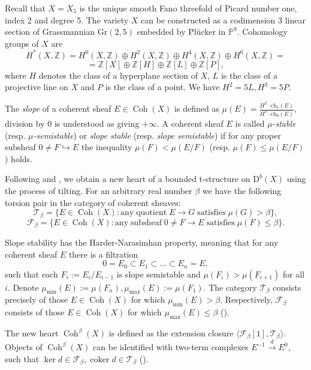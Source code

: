 \documentclass{amsart}
\newcommand{\Coh}{\operatorname{Coh}}
\DeclareMathOperator{\coker}{coker}
\def\Z{\ensuremath{\mathbb{Z}}}
\begin{document}
	Recall that $X=X_5$ is the unique smooth Fano threefold of Picard number one, index 2 and degree 5. The variety $X$ can be constructed as a codimension 3 linear section of Grassmannian $\mathrm{Gr}(2,5)$ embedded by Pl\"ucker in $\mathbb P^9$. Cohomology groups of $X$ are 
	$$H^*(X,\mathbb Z)=H^0(X,\mathbb Z)\oplus H^2(X,\mathbb Z)\oplus H^4(X,\mathbb Z)\oplus H^6(X,\mathbb Z)=$$
	$$=\Z[X]\oplus\Z[H]\oplus\Z[L]\oplus\Z[P],$$
	where $H$ denotes the class of a hyperplane section of $X$, $L$ is the class of a projective line on $X$ and $P$ is the class of a point. We have $H^2=5L,H^3=5P$.
	
	The \textit{slope} of a coherent sheaf $E\in\Coh(X)$ is defined as $\mu(E)=\frac{
		H^2\cdot\mathrm{ch}_1(E)}{H^3\cdot\mathrm{ch}_0(E)}$, division by 0 is understood as giving $+\infty$. A coherent sheaf $E$ is called
	$\mu$-\textit{stable} (resp. $\mu$\textit{-semistable}) or \textit{slope stable} (resp. \textit{slope semistable}) if for any proper
	subsheaf $0\ne F\hookrightarrow E$ the inequality $\mu(F)<\mu(E/F)$ (resp. $\mu(F)\le\mu(E/F)$) holds.
	
	Following \cite{BMT} and \cite{Sch18}, we obtain a new heart of a bounded t-structure on $\mathrm{D}^b(X)$ using the process of tilting. 
	For an arbitrary real number $\beta$ we have the following torsion pair in the category of coherent sheaves:
	$$\mathcal T_\beta=\{E\in\Coh(X)\colon\mathrm{any}\; \mathrm{quotient}\;E\to G\;\mathrm{satisfies}\;\mu(G)>\beta\},$$
	$$\mathcal F_\beta=\{E\in\Coh(X)\colon\mathrm{any}\;\mathrm{subsheaf}\;0\neq F\to E\;\mathrm{satisfies}\;\mu(F)\le\beta\}.$$
	
	Slope stability has the Harder-Narasimhan property, meaning that for any coherent sheaf $E$ there is a filtration
	$$0=E_0\subset E_1\subset\ldots\subset E_n=E,$$
	such that each $F_i:=E_i/E_{i-1}$ is slope semistable and 
	$\mu(F_i)>\mu(F_{i+1})$ for all $i$. 
	Denote $\mu_{\min}(E):=\mu(F_n),\mu_{\max}(E):=\mu(F_1)$. 
	The category $\mathcal T_\beta$ consists precisely of those $E\in\Coh(X)$ for which $\mu_{\min}(E)>\beta$. Respectively, $\mathcal F_\beta$ consists of those $E\in\Coh(X)$ for which $\mu_{\max}(E)\le\beta$ (\cite{BMT}).
	
	The new heart $\Coh^\beta(X)$ is defined as the extension closure $\langle\mathcal F_\beta[1],\mathcal T_\beta\rangle$. Objects of $\Coh^\beta(X)$ can be identified with two-term complexes $E^{-1}\overset{d}{\to} E^0$, such that $\ker d\in\mathcal F_\beta,\coker d\in\mathcal T_\beta$ (\cite[Section 2.3]{BMT}).
	
\end{document}
